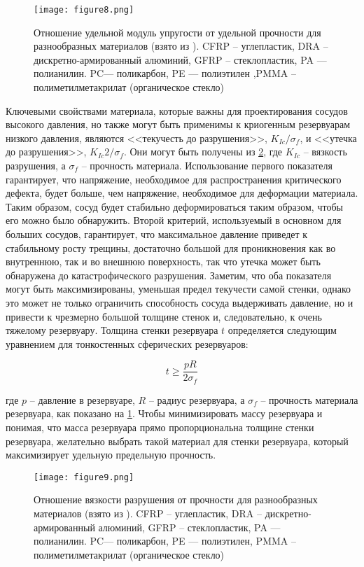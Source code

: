 \begin{figure}[h!]
\centering
\texttt{[image: figure8.png]}%
\caption{Отношение удельной модуль упругости от удельной прочности для разнообразных материалов  (взято из \cite{ashby2005}). CFRP -- углепластик, DRA -- дискретно-армированный алюминий, GFRP -- стеклопластик, PA --- полианилин. PC--- поликарбон, PE --- полиэтилен ,PMMA -- полиметилметакрилат (органическое стекло)}
\label{fig:figure8}
\end{figure}

Ключевыми свойствами материала, которые важны для проектирования сосудов высокого давления, но также могут быть применимы к криогенным резервуарам низкого давления, являются <<текучесть до разрушения>>, \(K_{Ic}/\sigma_f\), и <<утечка до разрушения>>, \(K_{Ic}2/\sigma_f\). Они могут быть получены из \cref{fig:figure9}, где \(K_{Ic}\) -- вязкость разрушения, а \(\sigma_f\) -- прочность материала. Использование первого показателя гарантирует, что напряжение, необходимое для распространения критического дефекта, будет больше, чем напряжение, необходимое для деформации материала. Таким образом, сосуд будет стабильно деформироваться таким образом, чтобы его можно было обнаружить. Второй критерий, используемый в основном для больших сосудов, гарантирует, что максимальное давление приведет к стабильному росту трещины, достаточно большой для проникновения как во внутреннюю, так и во внешнюю поверхность, так что утечка может быть обнаружена до катастрофического разрушения. Заметим, что оба показателя могут быть максимизированы, уменьшая предел текучести самой стенки, однако это может не только ограничить способность сосуда выдерживать давление, но и привести к чрезмерно большой толщине стенок и, следовательно, к очень тяжелому резервуару. Толщина стенки резервуара \(t\) определяется следующим уравнением для тонкостенных сферических резервуаров: 

\[t \geq \frac{pR}{2 \sigma_f}\]

где \(p\) -- давление в резервуаре, \(R\) -- радиус резервуара, а \(\sigma_f\) -- прочность материала резервуара, как показано на \cref{fig:figure8}. Чтобы минимизировать массу резервуара и понимая, что масса резервуара прямо пропорциональна толщине стенки резервуара, желательно выбрать такой материал для стенки резервуара, который максимизирует удельную предельную прочность.

\begin{figure}[h!]
\centering
\texttt{[image: figure9.png]}%
\caption{Отношение вязкости разрушения от прочности для разнообразных материалов  (взято из \cite{ashby2005}). CFRP -- углепластик, DRA -- дискретно-армированный алюминий, GFRP -- стеклопластик, PA --- полианилин. PC--- поликарбон, PE --- полиэтилен, PMMA -- полиметилметакрилат (органическое стекло)}
\label{fig:figure9}
\end{figure}

